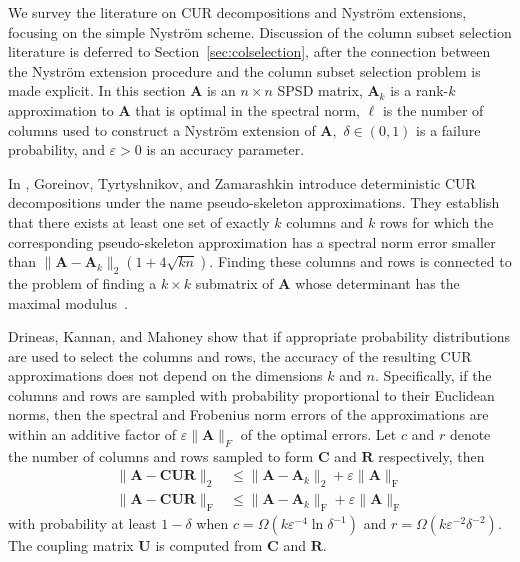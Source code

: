 \documentclass[11pt,letterpaper,twoside,reqno,nosumlimits]{amsart}
\newcommand{\mat}[1]{\ensuremath{\mathbf{#1}}}
\newcommand{\snorm}[1]{\ensuremath{\big\|#1\big\|_2}}
\newcommand{\fnorm}[1]{\ensuremath{\big\|#1\big\|_{\mathrm{F}}}}
\theoremstyle{remark}
\begin{document}
We survey the literature on CUR decompositions and Nystr\"om extensions, focusing on the simple Nystr\"om scheme. Discussion of the column subset selection literature is deferred to Section~\ref{sec:colselection}, after the connection between the Nystr\"om extension procedure and the column subset selection problem is made explicit. In this section $\mat{A}$ is an $n \times n$ SPSD matrix, $\mat{A}_k$ is a rank-$k$ approximation to $\mat{A}$ that is optimal in the spectral norm, $\ell$ is the number of columns used to construct a Nystr\"om extension of $\mat{A}, $ $\delta \in (0,1)$ is a failure probability, and $\varepsilon > 0$ is an accuracy parameter.

In \cite{GTZ97}, Goreinov, Tyrtyshnikov, and Zamarashkin introduce deterministic CUR decompositions under the name pseudo-skeleton approximations. They establish that there exists at least one set of exactly $k$ columns and $k$ rows for which the corresponding pseudo-skeleton approximation has a spectral norm error smaller than $\snorm{\mat{A} - \mat{A}_k} (1 +4 \sqrt{k n}).$ Finding these columns and rows is connected to the problem of finding a $k \times k$ submatrix of $\mat{A}$ whose determinant has the maximal modulus~\cite{GTZ97ii}.

Drineas, Kannan, and Mahoney \cite{DKM06} show that if appropriate probability distributions are used to select the columns and rows, the accuracy of the resulting CUR approximations does not depend on the dimensions $k$ and $n.$ Specifically, if the columns and rows are sampled with probability proportional to their Euclidean norms, then the spectral and Frobenius norm errors of the approximations are within an additive factor of $\varepsilon \|\mat{A}\|_F$ of the optimal errors. Let $c$ and $r$ denote the number of columns and rows sampled to form $\mat{C}$ and $\mat{R}$ respectively, then 
\begin{align*}
 \snorm{\mat{A} - \mat{C} \mat{U} \mat{R}} & \leq \snorm{\mat{A} - \mat{A}_k} + \varepsilon \fnorm{\mat{A}} \\
 \fnorm{\mat{A} - \mat{C} \mat{U} \mat{R}} & \leq \fnorm{\mat{A} - \mat{A}_k} + \varepsilon \fnorm{\mat{A}}
\end{align*}
with probability at least $1-\delta$ when $c = \Omega(k\varepsilon^{-4} \ln \delta^{-1})$ and $r = \Omega(k\varepsilon^{-2}\delta^{-2}).$ The coupling matrix $\mat{U}$ is computed from $\mat{C}$ and $\mat{R}.$
\end{document}
